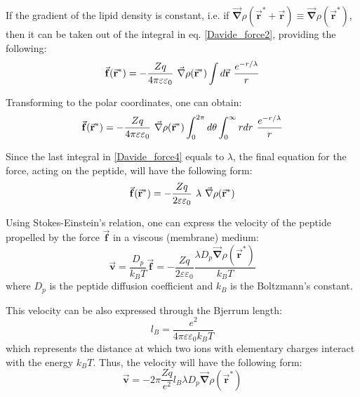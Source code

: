 If the gradient of the lipid density is constant, i.e. if $\vec{\mathbf{\nabla}}\rho(\vec{\mathbf{r}}^*+\vec{\mathbf{r}}) \equiv \vec{\mathbf{\nabla}}\rho(\vec{\mathbf{r}}^*)$, then it can be taken out of the integral in eq. \eqref{Davide_force2}, providing the following:
\begin{equation}
 \label{Davide_force3}
 \vec{\mathbf{f}}(\vec{\mathbf{r}}^*) = -\frac{Zq}{4\pi\varepsilon\varepsilon_0} \hspace{0.05in} \vec{\mathbf{\nabla}}\rho(\vec{\mathbf{r}}^*) \int d\vec{\mathbf{r}}\hspace{0.05in} \frac{e^{-r/\lambda}}{r}
\end{equation}

Transforming to the polar coordinates, one can obtain:
\begin{equation}
  \label{Davide_force4}
 \vec{\mathbf{f}}(\vec{\mathbf{r}}^*) = -\frac{Zq}{4\pi\varepsilon\varepsilon_0} \hspace{0.05in} \vec{\mathbf{\nabla}}\rho(\vec{\mathbf{r}}^*) \int_0^{2\pi} d\theta \int_0^\infty r dr\hspace{0.05in} \frac{e^{-r/\lambda}}{r}
\end{equation}

Since the last integral in \eqref{Davide_force4} equals to $\lambda$, the final equation for the force, acting on the peptide, will have the following form:
\begin{equation}
  \label{Davide_force5}
 \vec{\mathbf{f}}(\vec{\mathbf{r}}^*) = -\frac{Zq}{2\varepsilon\varepsilon_0} \hspace{0.05in}\lambda \hspace{0.05in}\vec{\mathbf{\nabla}}\rho(\vec{\mathbf{r}}^*)
\end{equation}

Using Stokes-Einstein's relation, one can express the velocity of the peptide propelled by the force $\vec{\mathbf{f}}$ in a viscous (membrane) medium:
\begin{equation}
\label{Davide_velocity1}
 \vec{\mathbf{v}} = \frac{D_p}{k_BT}\vec{\mathbf{f}} = -\frac{Zq}{2\varepsilon\varepsilon_0} \frac{\lambda D_p \vec{\mathbf{\nabla}}\rho(\vec{\mathbf{r}}^*)}{k_BT}
\end{equation}
where $D_p$ is the peptide diffusion coefficient and $k_B$ is the Boltzmann's constant.

This velocity can be also expressed through the Bjerrum length:
\begin{equation}
\label{bjerrum_length0}
 l_B = \frac{e^2}{4\pi\varepsilon\varepsilon_0 k_BT}
\end{equation}
which represents the distance at which two ions with elementary charges interact with the energy $k_BT$. Thus, the velocity will have the following form:
\begin{equation}
\label{Davide_velocity2}
 \vec{\mathbf{v}} =  -2\pi\frac{Zq}{e^2} l_B \lambda D_p \vec{\mathbf{\nabla}}\rho(\vec{\mathbf{r}}^*)
\end{equation}

